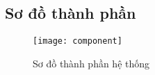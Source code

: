\subsection{Sơ đồ thành phần}

\begin{figure}[h!]
	\begin{center}	
		\texttt{[image: component]}
		\caption{Sơ đồ thành phần hệ thống}
	\end{center}
\end{figure}